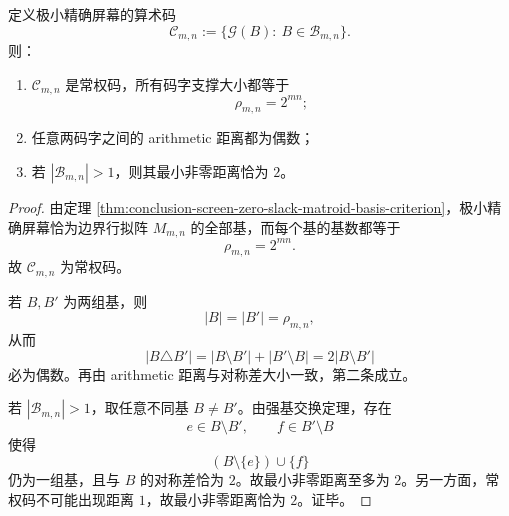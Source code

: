 \begin{corollary}[极小精确屏幕算术码的常权偶距结构]\label{cor:conclusion-screen-minimal-exact-code-constant-weight-even-metric}
定义极小精确屏幕的算术码
\[
\mathcal C_{m,n}
:=
\{\mathcal G(B):\ B\in \mathcal B_{m,n}\}.
\]
则：
\begin{enumerate}
  \item \(\mathcal C_{m,n}\) 是常权码，所有码字支撑大小都等于
        \[
        \rho_{m,n}=2^{mn};
        \]
  \item 任意两码字之间的 arithmetic 距离都为偶数；
  \item 若 \(|\mathcal B_{m,n}|>1\)，则其最小非零距离恰为 \(2\)。
\end{enumerate}
\end{corollary}
\begin{proof}
由定理 \ref{thm:conclusion-screen-zero-slack-matroid-basis-criterion}，极小精确屏幕恰为边界行拟阵 \(M_{m,n}\) 的全部基，而每个基的基数都等于
\[
\rho_{m,n}=2^{mn}.
\]
故 \(\mathcal C_{m,n}\) 为常权码。

若 \(B,B'\) 为两组基，则
\[
|B|=|B'|=\rho_{m,n},
\]
从而
\[
|B\triangle B'|
=
|B\setminus B'|+|B'\setminus B|
=
2|B\setminus B'|
\]
必为偶数。再由 arithmetic 距离与对称差大小一致，第二条成立。

若 \(|\mathcal B_{m,n}|>1\)，取任意不同基 \(B\neq B'\)。由强基交换定理，存在
\[
e\in B\setminus B',
\qquad
f\in B'\setminus B
\]
使得
\[
(B\setminus\{e\})\cup\{f\}
\]
仍为一组基，且与 \(B\) 的对称差恰为 \(2\)。故最小非零距离至多为 \(2\)。另一方面，常权码不可能出现距离 \(1\)，故最小非零距离恰为 \(2\)。证毕。
\end{proof}

\endinput

